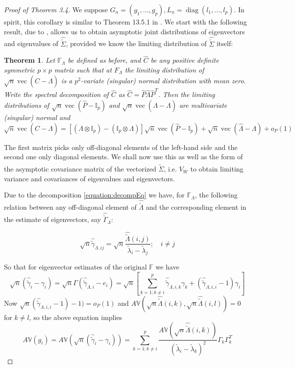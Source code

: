 \documentclass[ejs]{imsart}
\newcommand{\BF}{{\mathbb{F}}}
\newcommand{\BI}{{\mathbb{I}}}
\newcommand{\BV}{{\mathbb{V}}}
\DeclareMathOperator*{\ve}{vec}
\DeclareMathOperator*{\diag}{diag }
\newtheorem{Theorem}{Theorem}[section]
\theoremstyle{definition} \newtheorem{Definition}[Theorem]{Definition}
\begin{document}
\begin{proof}[Proof of Theorem 3.4]
We suppose $G_n = (g_1, \ldots, g_p), L_n = \diag(l_1, \ldots, l_p)$. In spirit, this corollary is similar to Theorem 13.5.1 in \cite{ref:AndersonBook09}. We start with the following result, due to \citep{ref:SPL12765_Taskinenetal}, allows us to obtain asymptotic joint distributions of eigenvectors and eigenvalues of $\hat{\tilde \Sigma}$, provided we know the limiting distribution of $\hat{\tilde \Sigma}$ itself:

\begin{Theorem} \label{Theorem:decomp} 
Let $\BF_\Lambda$ be defined as before, and $\hat C$ be any positive definite symmetric $p \times p$ matrix such that at $F_\Lambda$ the limiting distribution of $\sqrt n \ve(\hat C - \Lambda)$ is a $p^2$-variate (singular) normal distribution with mean zero. Write the spectral decomposition of $\hat C$ as $\hat C = \hat P \hat\Lambda \hat P^T$. Then the limiting distributions of $\sqrt n \ve(\hat P - \BI_p)$ and $\sqrt n \ve( \hat\Lambda - \Lambda)$ are multivariate (singular) normal and
%
\begin{equation} \label{equation:decompEq}
\sqrt n \ve (\hat C - \Lambda)  = \left[ (\Lambda \otimes \BI_p) - (\BI_p \otimes \Lambda) \right] \sqrt n \ve (\hat P - \BI_p) + \sqrt n \ve (\hat \Lambda - \Lambda) + o_P(1)
\end{equation}
\end{Theorem}

The first matrix picks only off-diagonal elements of the left-hand side and the second one only diagonal elements. We shall now use this as well as the form of the asymptotic covariance matrix of the vectorized $\hat {\tilde \Sigma}$, i.e. $V_W$ to obtain limiting variance and covariances of eigenvalues and eigenvectors.

Due to the decomposition \eqref{equation:decompEq} we have, for $\BF_\Lambda$, the following relation between any off-diagonal element of $\hat{\tilde \Lambda}$ and the corresponding element in the estimate of eigenvectors, say $\hat {\tilde \Gamma}_\Lambda$:

$$ \sqrt n \hat {\tilde \gamma}_{\Lambda, ij} = \sqrt n \frac{\hat {\tilde \Lambda} (i,j) }{\tilde \lambda_i - \tilde \lambda_j}; \quad i \neq j$$

So that for eigenvector estimates of the original $\BF$ we have
%
\begin{equation}\label{equation:app1}
\sqrt n ( \hat{\tilde \gamma}_{i} - \gamma_i) =
\sqrt n \Gamma ( \hat {\tilde \gamma}_{\Lambda, i} - e_i ) =
\sqrt n \left[ \sum_{k=1; k \neq i}^p \hat {\tilde \gamma}_{\Lambda,i,k} \gamma_k + (\hat {\tilde \gamma}_{\Lambda,i,i} - 1) \gamma_i \right]
\end{equation}
%
Now $\sqrt n (\hat {\tilde \gamma}_{\Lambda,i,i} - 1) - 1) =  o_P(1)$ and $A\BV(\sqrt n \hat {\tilde \Lambda} (i,k), \sqrt n \hat {\tilde \Lambda} (i,l) ) = 0$ for $k \neq l$, so the above equation implies
%
$$ A\BV(g_i) = A \BV (\sqrt n ( \hat{\tilde \gamma}_{i} - \gamma_i)) = \sum_{k=1; k \neq i}^p \frac{A\BV(\sqrt n \hat {\tilde \Lambda} (i,k))}{(\tilde \lambda_i - \tilde \lambda_k)^2} \Gamma_k \Gamma_k^T $$
%


\end{proof}
\end{document}
